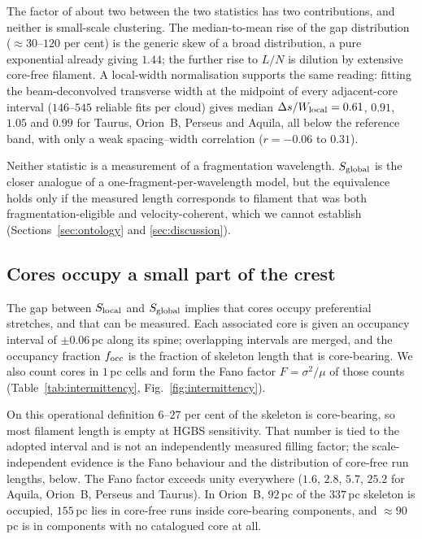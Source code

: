 \documentclass[usenatbib,twoside,twocolumn]{mnras}
\begin{document}
The factor of about two between the two statistics has two contributions, and neither is small-scale clustering. The median-to-mean rise of the gap distribution ($\approx30$--$120$ per cent) is the generic skew of a broad distribution, a pure exponential already giving $1.44$; the further rise to $L/N$ is dilution by extensive core-free filament. A local-width normalisation supports the same reading: fitting the beam-deconvolved transverse width at the midpoint of every adjacent-core interval ($146$--$545$ reliable fits per cloud) gives median $\Delta s/W_{\rm local}=0.61$, $0.91$, $1.05$ and $0.99$ for Taurus, Orion~B, Perseus and Aquila, all below the reference band, with only a weak spacing--width correlation ($r=-0.06$ to $0.31$).

Neither statistic is a measurement of a fragmentation wavelength. $S_{\rm global}$ is the closer analogue of a one-fragment-per-wavelength model, but the equivalence holds only if the measured length corresponds to filament that was both fragmentation-eligible and velocity-coherent, which we cannot establish (Sections~\ref{sec:ontology} and \ref{sec:discussion}).

\subsection{Cores occupy a small part of the crest}
\label{sec:occupancy}


The gap between $S_{\rm local}$ and $S_{\rm global}$ implies that cores occupy preferential stretches, and that can be measured. Each associated core is given an occupancy interval of $\pm0.06$\,pc along its spine; overlapping intervals are merged, and the occupancy fraction $f_{\rm occ}$ is the fraction of skeleton length that is core-bearing. We also count cores in $1$\,pc cells and form the Fano factor $F=\sigma^2/\mu$ of those counts (Table~\ref{tab:intermittency}, Fig.~\ref{fig:intermittency}).

On this operational definition $6$--$27$ per cent of the skeleton is core-bearing, so most filament length is empty at HGBS sensitivity. That number is tied to the adopted interval and is not an independently measured filling factor; the scale-independent evidence is the Fano behaviour and the distribution of core-free run lengths, below. The Fano factor exceeds unity everywhere ($1.6$, $2.8$, $5.7$, $25.2$ for Aquila, Orion~B, Perseus and Taurus). In Orion~B, $92$\,pc of the $337$\,pc skeleton is occupied, $155$\,pc lies in core-free runs inside core-bearing components, and $\approx90$\,pc is in components with no catalogued core at all.
\end{document}
